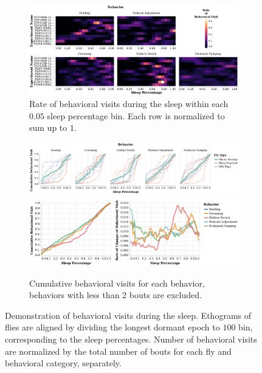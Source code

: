 \begin{figure}[ht!]
	\centering
	\begin{subfigure}[ht!]{0.975\linewidth}
		\centering\includegraphics[width=\linewidth]{figures/Heatmap_BehavioralUsage-Ann.pdf}
		\caption{Rate of behavioral visits during the sleep within each $0.05$ sleep percentage bin. Each row is normalized to sum up to $1$.}
	\end{subfigure}%

	\centering
	\begin{subfigure}[ht!]{0.975\linewidth}
		\centering\includegraphics[width=\linewidth]{figures/CumulativeLine_BehavioralUsage-Ann.pdf}
		\centering\includegraphics[width=\linewidth]{figures/MeanCumRofC_BehavioralUsage-Ann.pdf}
		\caption{Cumulative behavioral visits for each behavior, behaviors with less than 2 bouts are excluded.}
	\end{subfigure}%

	\caption[Demonstration of behavioral visits during the sleep.]{Demonstration of behavioral visits during the sleep.
		Ethograms of flies are aligned by dividing the longest dormant epoch to $100$ bin, corresponding to the sleep percentages.
		Number of behavioral visits are normalized by the total number of bouts for each fly and behavioral category, separately.}

\end{figure}
